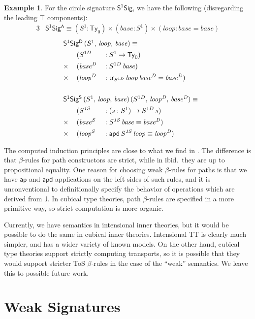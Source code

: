 \documentclass[12pt,a4paper,twoside,openany]{book}
\theoremstyle{remark}
\theoremstyle{definition}
\newtheorem{myexample}{Example}
\theoremstyle{theorem}
\newcommand{\mi}[1]{\mathit{#1}}
\newcommand{\ms}[1]{\mathsf{#1}}
\newcommand{\ap}{\ms{ap}}
\newcommand{\apd}{\ms{apd}}
\newcommand{\tr}{\ms{tr}}
\newcommand{\J}{\ms{J}}
\newcommand{\Ty}{\mathsf{Ty}}
\begin{document}
\begin{myexample}
For the circle signature $\ms{S^1Sig}$, we have the following (disregarding
the leading $\top$ components):
\begin{alignat*}{3}
  &\ms{S^1Sig^A} \equiv (S^1 : \Ty_0)
  \times (\mi{base} : S^1) \times (\mi{loop} : \mi{base} = \mi{base})
\end{alignat*}
\begin{alignat*}{3}
  &\rlap{$\ms{S^1Sig^D}\,(S^1,\,\mi{loop},\,\mi{base}) \equiv$}\\
  &        &&(S^{1D}        &&: S^1 \to \Ty_0)\\
  & \times\,&&(\mi{base^D} &&: S^{1D}\,\mi{base})\\
  & \times\,&&(\mi{loop^D} &&: \tr_{S^{1D}}\,\mi{loop}\,\mi{base^D} = \mi{base^D})\\
  & &&\\
  &\rlap{$\ms{S^1Sig^S}\,(S^1,\,\mi{loop},\,\mi{base})\,(S^{1D},\,\mi{loop^D},\,\mi{base^D}) \equiv$}\\
  &         &&(\mi{S^{1S}}  &&: (s : S^1) \to S^{1D}\,s)\\
  & \times\,&&(\mi{base^S} &&: \mi{S^{1S}}\,\mi{base} \equiv \mi{base^D})\\
  & \times\,&&(\mi{loop^S} &&: \apd\,\mi{S^{1S}}\,\mi{loop} \equiv \mi{loop^D})
\end{alignat*}
\end{myexample}
The computed induction principles are close to what we find in
\cite{hottbook}. The difference is that $\beta$-rules for path constructors are
strict, while in ibid.\ they are up to propositional equality. One reason for
choosing weak $\beta$-rules for paths is that we have $\ap$ and $\apd$ applications on the
left sides of such rules, and it is unconventional to definitionally specify the
behavior of operations which are derived from $\J$. In cubical type theories,
path $\beta$-rules are specified in a more primitive way, so strict computation is
more organic.

Currently, we have semantics in intensional inner theories, but it would be
possible to do the same in cubical inner theories. Intensional TT is clearly
much simpler, and has a wider variety of known models. On the other hand,
cubical type theories support strictly computing transports, so it is possible
that they would support stricter ToS $\beta$-rules in the case of the ``weak''
semantics. We leave this to possible future work.

\section{Weak Signatures}
\end{document}

